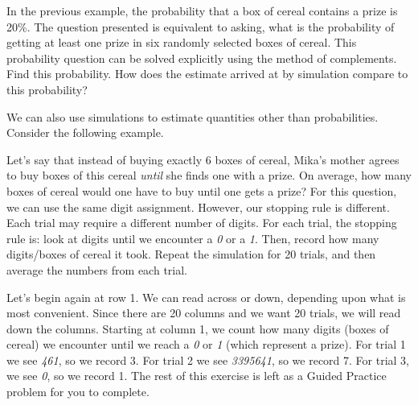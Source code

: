 \begin{exercisewrap}
\begin{nexercise}In the previous example, the probability that a box of cereal contains a prize is 20\%. The question presented is equivalent to asking, what is the probability of getting at least one prize in six randomly selected boxes of cereal. This probability question can be solved explicitly using the method of complements. Find this probability. How does the estimate arrived at by simulation compare to this probability?\footnotemark
\end{nexercise}
\end{exercisewrap}

\D{\newpage}

We can also use simulations to estimate quantities other than probabilities. Consider the following example.

\begin{examplewrap}
\begin{nexample}{Let's say that instead of buying exactly 6 boxes of cereal, Mika's mother agrees to buy boxes of this cereal \emph{until} she finds one with a prize. On average, how many boxes of cereal would one have to buy until one gets a prize?}
For this question, we can use the same digit assignment. However, our stopping rule is different. Each trial may require a different number of digits. For each trial, the stopping rule is:  look at digits until we encounter a \emph{0} or a \emph{1}. Then, record how many digits/boxes of cereal it took. Repeat the simulation for 20 trials, and then average the numbers from each trial.

Let's begin again at row 1. We can read across or down, depending upon what is most convenient. Since there are 20 columns and we want 20 trials, we will read down the columns. Starting at column 1, we count how many digits (boxes of cereal) we encounter until we reach a \emph{0} or \emph{1} (which represent a prize). For trial 1 we see \emph{461}, so we record 3. For trial 2 we see \emph{3395641}, so we record 7. For trial 3, we see \emph{0}, so we record 1. The rest of this exercise is left as a Guided Practice problem for you to complete.
\end{nexample}
\end{examplewrap}

